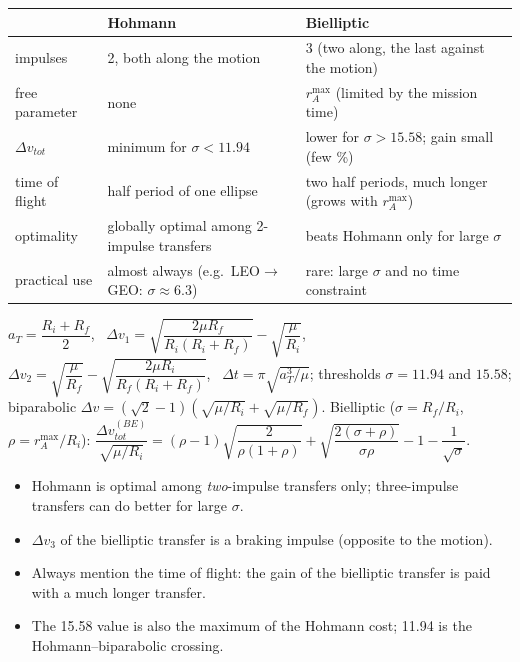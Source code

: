 \begin{center}
\small
\begin{tabular}{@{}p{3.4cm}p{5.6cm}p{5.6cm}@{}}
\toprule
 & Hohmann & Bielliptic\\
\midrule
impulses & 2, both along the motion & 3 (two along, the last against the motion)\\
free parameter & none & $r_A^{\max}$ (limited by the mission time)\\
$\Delta v_{tot}$ & minimum for $\sigma<11.94$ & lower for $\sigma>15.58$; gain small (few \%)\\
time of flight & half period of one ellipse & two half periods, much longer (grows with $r_A^{\max}$)\\
optimality & globally optimal among 2-impulse transfers & beats Hohmann only for large $\sigma$\\
practical use & almost always (e.g.\ LEO$\to$GEO: $\sigma\approx6.3$) & rare: large $\sigma$ and no time constraint\\
\bottomrule
\end{tabular}
\end{center}

\begin{keyf}
$a_T=\dfrac{R_i+R_f}{2}$, \ $\Delta v_1=\sqrt{\dfrac{2\mu R_f}{R_i(R_i+R_f)}}-\sqrt{\dfrac{\mu}{R_i}}$, \
$\Delta v_2=\sqrt{\dfrac{\mu}{R_f}}-\sqrt{\dfrac{2\mu R_i}{R_f(R_i+R_f)}}$, \ $\Delta t=\pi\sqrt{a_T^3/\mu}$;
thresholds $\sigma=11.94$ and $15.58$; biparabolic $\Delta v=(\sqrt2-1)(\sqrt{\mu/R_i}+\sqrt{\mu/R_f})$.
Bielliptic ($\sigma=R_f/R_i$, $\rho=r_A^{\max}/R_i$): $\dfrac{\Delta v^{(BE)}_{tot}}{\sqrt{\mu/R_i}}=(\rho-1)\sqrt{\dfrac{2}{\rho(1+\rho)}}+\sqrt{\dfrac{2(\sigma+\rho)}{\sigma\rho}}-1-\dfrac{1}{\sqrt\sigma}$.
\end{keyf}

\pitfalls
\begin{itemize}
\item Hohmann is optimal among \emph{two}-impulse transfers only; three-impulse transfers can do better for large $\sigma$.
\item $\Delta v_3$ of the bielliptic transfer is a braking impulse (opposite to the motion).
\item Always mention the time of flight: the gain of the bielliptic transfer is paid with a much longer transfer.
\item The 15.58 value is also the maximum of the Hohmann cost; 11.94 is the Hohmann--biparabolic crossing.
\end{itemize}

